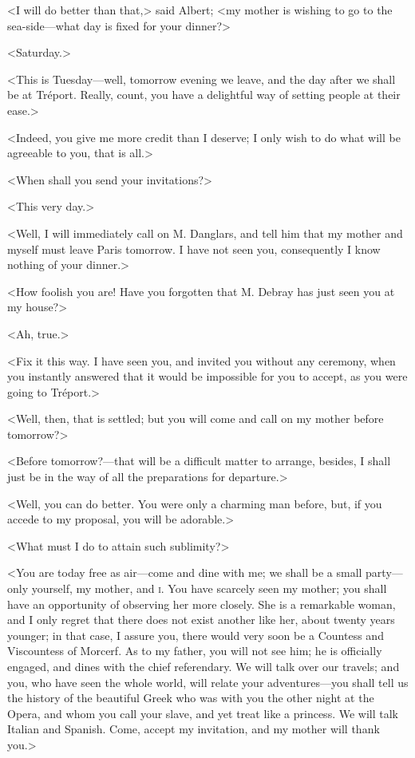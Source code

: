  <I will do better than that,> said Albert; <my mother is wishing to go to the sea-side—what day is fixed for your dinner?> 

 <Saturday.> 

 <This is Tuesday—well, tomorrow evening we leave, and the day after we shall be at Tréport. Really, count, you have a delightful way of setting people at their ease.> 

 <Indeed, you give me more credit than I deserve; I only wish to do what will be agreeable to you, that is all.> 

 <When shall you send your invitations?> 

 <This very day.> 

 <Well, I will immediately call on M. Danglars, and tell him that my mother and myself must leave Paris tomorrow. I have not seen you, consequently I know nothing of your dinner.> 

 <How foolish you are! Have you forgotten that M. Debray has just seen you at my house?> 

 <Ah, true.> 

 <Fix it this way. I have seen you, and invited you without any ceremony, when you instantly answered that it would be impossible for you to accept, as you were going to Tréport.> 

 <Well, then, that is settled; but you will come and call on my mother before tomorrow?> 

 <Before tomorrow?—that will be a difficult matter to arrange, besides, I shall just be in the way of all the preparations for departure.> 

 <Well, you can do better. You were only a charming man before, but, if you accede to my proposal, you will be adorable.> 

 <What must I do to attain such sublimity?> 

 <You are today free as air—come and dine with me; we shall be a small party—only yourself, my mother, and \textsc{i.} You have scarcely seen my mother; you shall have an opportunity of observing her more closely. She is a remarkable woman, and I only regret that there does not exist another like her, about twenty years younger; in that case, I assure you, there would very soon be a Countess and Viscountess of Morcerf. As to my father, you will not see him; he is officially engaged, and dines with the chief referendary. We will talk over our travels; and you, who have seen the whole world, will relate your adventures—you shall tell us the history of the beautiful Greek who was with you the other night at the Opera, and whom you call your slave, and yet treat like a princess. We will talk Italian and Spanish. Come, accept my invitation, and my mother will thank you.> 

